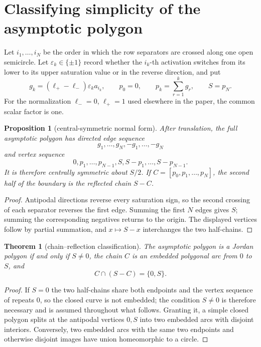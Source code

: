 \documentclass[11pt,twoside,leqno]{article}
\theoremstyle{plain}
\newtheorem{theorem}{Theorem}[section]
\newtheorem{proposition}[proposition]{Proposition}
\theoremstyle{definition}
\theoremstyle{remark}
\begin{document}
\section{Classifying simplicity of the asymptotic polygon}\label{sec:simplicity}

Let $i_1,\ldots,i_N$ be the order in which the row separators are crossed along one open semicircle.  Let $\varepsilon_k\in\{\pm1\}$ record whether the $i_k$-th activation switches from its lower to its upper saturation value or in the reverse direction, and put
\[
 g_k=(\ell_+-\ell_-)\varepsilon_k a_{i_k},\qquad
 p_0=0,\qquad p_k=\sum_{r=1}^k g_r,\qquad S=p_N.
\]
For the normalization $\ell_-=0$, $\ell_+=1$ used elsewhere in the paper, the common scalar factor is one.

\begin{proposition}[central-symmetric normal form]\label{prop:normal-form}
After translation, the full asymptotic polygon has directed edge sequence
\[
 g_1,\ldots,g_N,-g_1,\ldots,-g_N
\]
and vertex sequence
\[
 0,p_1,\ldots,p_{N-1},S,S-p_1,\ldots,S-p_{N-1}.
\]
It is therefore centrally symmetric about $S/2$.  If $C=[p_0,p_1,\ldots,p_N]$, the second half of the boundary is the reflected chain $S-C$.
\end{proposition}

\begin{proof}
Antipodal directions reverse every saturation sign, so the second crossing of each separator reverses the first edge.  Summing the first $N$ edges gives $S$; summing the corresponding negatives returns to the origin.  The displayed vertices follow by partial summation, and $x\mapsto S-x$ interchanges the two half-chains.
\end{proof}

\begin{theorem}[chain--reflection classification]\label{thm:chain-reflection}
The asymptotic polygon is a Jordan polygon if and only if $S\neq0$, the chain $C$ is an embedded polygonal arc from $0$ to $S$, and
\[
 C\cap(S-C)=\{0,S\}.
\]
\end{theorem}

\begin{proof}
If $S=0$ the two half-chains share both endpoints and the vertex sequence of  repeats $0$, so the closed curve is not embedded; the condition $S\neq0$ is therefore necessary and is assumed throughout what follows.  Granting it, a simple closed polygon splits at the antipodal vertices $0,S$ into two embedded arcs with disjoint interiors.  Conversely, two embedded arcs with the same two endpoints and otherwise disjoint images have union homeomorphic to a circle.
\end{proof}
\end{document}
